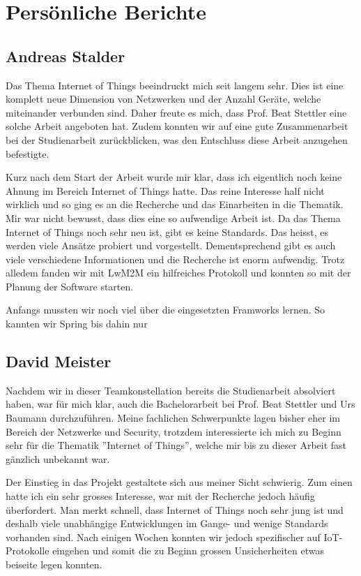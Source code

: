 \chapter{Persönliche Berichte}

\section{Andreas Stalder}
Das Thema Internet of Things beeindruckt mich seit langem sehr. Dies ist eine komplett neue Dimension von Netzwerken und der Anzahl Geräte, welche miteinander verbunden sind. Daher freute es mich, dass Prof. Beat Stettler eine solche Arbeit angeboten hat. Zudem konnten wir auf eine gute Zusammenarbeit bei der Studienarbeit zurückblicken, was den Entschluss diese Arbeit anzugehen befestigte.

Kurz nach dem Start der Arbeit wurde mir klar, dass ich eigentlich noch keine Ahnung im Bereich Internet of Things hatte. Das reine Interesse half nicht wirklich und so ging es an die Recherche und das Einarbeiten in die Thematik. Mir war nicht bewusst, dass dies eine so aufwendige Arbeit ist. Da das Thema Internet of Things noch sehr neu ist, gibt es keine Standards. Das heisst, es werden viele Ansätze probiert und vorgestellt. Dementsprechend gibt es auch viele verschiedene Informationen und die Recherche ist enorm aufwendig. Trotz alledem fanden wir mit LwM2M ein hilfreiches Protokoll und konnten so mit der Planung der Software starten.

Anfangs mussten wir noch viel über die eingesetzten Framworks lernen. So kannten wir Spring bis dahin nur 





\newpage
\section{David Meister}
Nachdem wir in dieser Teamkonstellation bereits die Studienarbeit absolviert haben, war für mich klar, auch die Bachelorarbeit bei Prof. Beat Stettler und Urs Baumann durchzuführen. Meine fachlichen Schwerpunkte lagen bisher eher im Bereich der Netzwerke und Security, trotzdem interessierte ich mich zu Beginn sehr für die Thematik ''Internet of Things'', welche mir bis zu dieser Arbeit fast gänzlich unbekannt war.

Der Einstieg in das Projekt gestaltete sich aus meiner Sicht schwierig. Zum einen hatte ich ein sehr grosses Interesse, war mit der Recherche jedoch häufig überfordert. Man merkt schnell, dass Internet of Things noch sehr jung ist und deshalb viele unabhängige Entwicklungen im Gange- und wenige Standards vorhanden sind. Nach einigen Wochen konnten wir jedoch spezifischer auf IoT-Protokolle eingehen und somit die zu Beginn grossen Unsicherheiten etwas beiseite legen konnten.

